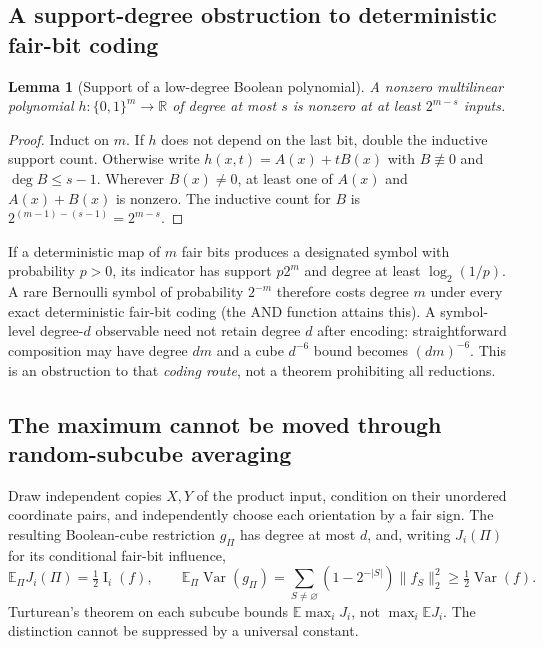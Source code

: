 \documentclass[11pt,letterpaper]{article}
\newtheorem{lemma}[theorem]{Lemma}
\theoremstyle{definition}\newtheorem{definition}[theorem]{Definition}
\newcommand{\E}{\mathbb E}
\newcommand{\Var}{\operatorname{Var}}
\newcommand{\Inf}{\operatorname{I}}
\newcommand{\abs}[1]{\lvert #1\rvert}
\newcommand{\norm}[1]{\lVert #1\rVert}
\begin{document}
\subsection{A support-degree obstruction to deterministic fair-bit coding}
\begin{lemma}[Support of a low-degree Boolean polynomial]\label{lem:support}
A nonzero multilinear polynomial $h:\{0,1\}^m\to\mathbb R$ of degree at most $s$ is nonzero at at least $2^{m-s}$ inputs.
\end{lemma}
\begin{proof}
Induct on $m$. If $h$ does not depend on the last bit, double the inductive support count. Otherwise write $h(x,t)=A(x)+tB(x)$ with $B\not\equiv0$ and $\deg B\le s-1$. Wherever $B(x)\ne0$, at least one of $A(x)$ and $A(x)+B(x)$ is nonzero. The inductive count for $B$ is $2^{(m-1)-(s-1)}=2^{m-s}$.
\end{proof}
If a deterministic map of $m$ fair bits produces a designated symbol with probability $p>0$, its indicator has support $p2^m$ and degree at least $\log_2(1/p)$. A rare Bernoulli symbol of probability $2^{-m}$ therefore costs degree $m$ under every exact deterministic fair-bit coding (the AND function attains this). A symbol-level degree-$d$ observable need not retain degree $d$ after encoding: straightforward composition may have degree $dm$ and a cube $d^{-6}$ bound becomes $(dm)^{-6}$. This is an obstruction to that \emph{coding route}, not a theorem prohibiting all reductions.

\subsection{The maximum cannot be moved through random-subcube averaging}
Draw independent copies $X,Y$ of the product input, condition on their unordered coordinate pairs, and independently choose each orientation by a fair sign. The resulting Boolean-cube restriction $g_\Pi$ has degree at most $d$, and, writing $J_i(\Pi)$ for its conditional fair-bit influence,
\begin{equation}\label{eq:subcube}
\E_\Pi J_i(\Pi)=\tfrac12\Inf_i(f),\qquad
\E_\Pi\Var(g_\Pi)=\sum_{S\ne\varnothing}(1-2^{-\abs S})\norm{f_S}_2^2\ge\tfrac12\Var(f).
\end{equation}
Turturean's theorem on each subcube bounds $\E\max_i J_i$, not $\max_i\E J_i$. The distinction cannot be suppressed by a universal constant.
\end{document}
